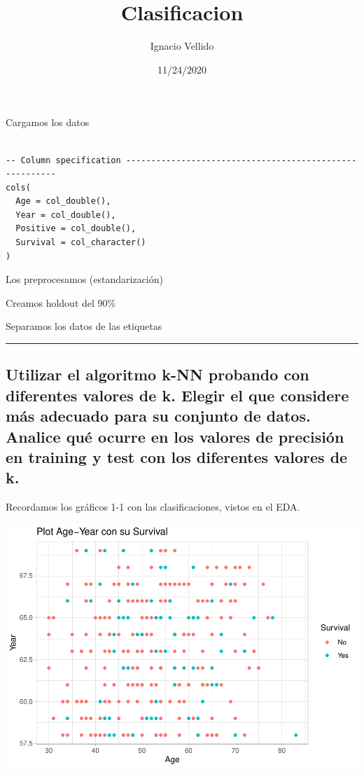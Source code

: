 \documentclass[
]{article}
\title{Clasificacion}
\author{Ignacio Vellido}
\date{11/24/2020}
\begin{document}
\maketitle

Cargamos los datos

\begin{verbatim}

-- Column specification --------------------------------------------------------
cols(
  Age = col_double(),
  Year = col_double(),
  Positive = col_double(),
  Survival = col_character()
)
\end{verbatim}

Los preprocesamos (estandarización)

Creamos holdout del 90\%

Separamos los datos de las etiquetas

\begin{center}\rule{0.5\linewidth}{0.5pt}\end{center}

\hypertarget{utilizar-el-algoritmo-k-nn-probando-con-diferentes-valores-de-k.-elegir-el-que-considere-muxe1s-adecuado-para-su-conjunto-de-datos.-analice-quuxe9-ocurre-en-los-valores-de-precisiuxf3n-en-training-y-test-con-los-diferentes-valores-de-k.}{%
\subsection{Utilizar el algoritmo k-NN probando con diferentes valores
de k. Elegir el que considere más adecuado para su conjunto de datos.
Analice qué ocurre en los valores de precisión en training y test con
los diferentes valores de
k.}\label{utilizar-el-algoritmo-k-nn-probando-con-diferentes-valores-de-k.-elegir-el-que-considere-muxe1s-adecuado-para-su-conjunto-de-datos.-analice-quuxe9-ocurre-en-los-valores-de-precisiuxf3n-en-training-y-test-con-los-diferentes-valores-de-k.}}

Recordamos los gráficos 1-1 con las clasificaciones, vistos en el EDA.

\begin{center}\includegraphics{Clasificacion_files/figure-latex/unnamed-chunk-7-1} \end{center}
\end{document}
